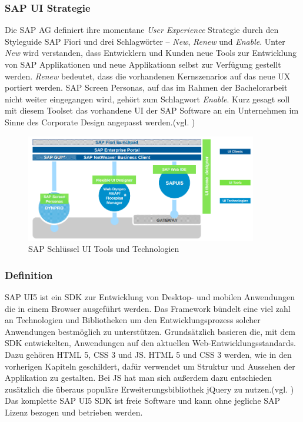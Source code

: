 \subsubsection{SAP UI Strategie}
Die SAP AG definiert ihre momentane \textit{User Experience} Strategie durch den Styleguide SAP Fiori und drei Schlagwörter -- \textit{New}, \textit{Renew} und \textit{Enable}. Unter \textit{New} wird verstanden, dass Entwicklern und Kunden neue Tools zur Entwicklung von SAP Applikationen und neue Applikationn selbst zur Verfügung gestellt werden. \textit{Renew} bedeutet, dass die vorhandenen Kernszenarios auf das neue UX portiert werden. SAP Screen Personas, auf das im Rahmen der Bachelorarbeit nicht weiter eingegangen wird, gehört zum Schlagwort \textit{Enable}. Kurz gesagt soll mit diesem Toolset das vorhandene UI der SAP Software an ein Unternehmen im Sinne des Corporate Design angepasst werden.(vgl. \cite{SAPUX})

\vspace{1em}
\begin{figure}[htb]
  \centering
  \includegraphics[width=0.9\textwidth]{abb/sap_key_ui_tools}
  \caption[SAP Schlüssel UI Tools und Technologien]{SAP Schlüssel UI Tools und Technologien \cite{SAPUXPDF}}
  \label{fig:sapkeyuitools}
\end{figure}

\subsubsection{Definition}
SAP UI5 ist ein SDK zur Entwicklung von Desktop- und mobilen Anwendungen die in einem Browser ausgeführt werden. Das Framework bündelt eine viel zahl an Technologien und Bibliotheken um den Entwicklungsprozess solcher Anwendungen bestmöglich zu unterstützen. Grundsätzlich basieren die, mit dem SDK entwickelten, Anwendungen auf den aktuellen Web-Entwicklungsstandards. Dazu gehören HTML 5, CSS 3 und JS. HTML 5 und CSS 3 werden, wie in den vorherigen Kapiteln geschildert, dafür verwendet um Struktur und Aussehen der Applikation zu gestalten. Bei JS hat man sich außerdem dazu entschieden zusätzlich die überaus populäre Erweiterungsbibliothek jQuery zu nutzen.(vgl. \cite{BuiltWith2014}) Das komplette SAP UI5 SDK ist freie Software und kann ohne jegliche SAP Lizenz bezogen und betrieben werden.

